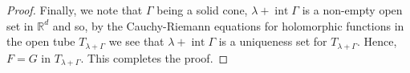 \documentclass[10pt,a4paper]{amsart}
\begin{document}
\begin{proof}
Finally, we note that $\Gamma$ being a solid cone, $\lambda + \operatorname{int} \Gamma$ is a non-empty open set in $\mathbb{R}^d$ and so, by the Cauchy-Riemann equations for holomorphic functions in the open tube $T_{\lambda + \Gamma}$ we see that $\lambda + \operatorname{int} \Gamma$ is a uniqueness set for $T_{\lambda +\Gamma}$. Hence, $F=G$ in $T_{\lambda + \Gamma}$. This completes the proof.

\end{proof}
\end{document}

